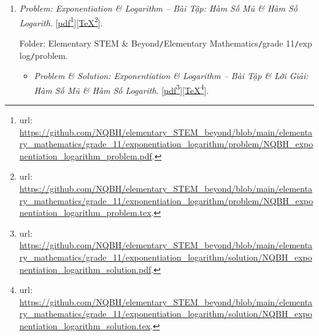 \documentclass[12pt,oneside]{book}
\begin{document}
\begin{enumerate}
	Folder: {\sf Elementary STEM \& Beyond{\tt/}Elementary Mathematics{\tt/}grade 11{\tt/}probability \& statistics{\tt/}problem}.
	\begin{itemize}
		\item {\it Problem \& Solution: Probability \& Statistics -- Bài Tập \& Lời Giải: Xác Suất \& Thống Kê}. [\href{https://github.com/NQBH/elementary_STEM_beyond/blob/main/elementary_mathematics/grade_11/probability_statistics/solution/NQBH_probability_statistics_solution.pdf}{pdf}\footnote{{\sc url}: \url{https://github.com/NQBH/elementary_STEM_beyond/blob/main/elementary_mathematics/grade_11/probability_statistics/solution/NQBH_probability_statistics_solution.pdf}.}][\href{https://github.com/NQBH/elementary_STEM_beyond/blob/main/elementary_mathematics/grade_11/probability_statistics/solution/NQBH_probability_statistics_solution.tex}{\TeX}\footnote{{\sc url}: \url{https://github.com/NQBH/elementary_STEM_beyond/blob/main/elementary_mathematics/grade_11/probability_statistics/solution/NQBH_probability_statistics_solution.tex}.}].
		
		Folder: {\sf Elementary STEM \& Beyond{\tt/}Elementary Mathematics{\tt/}grade 11{\tt/}probability \& statistics{\tt/}solution}.
	\end{itemize}	
	\item {\it Problem: Exponentiation \& Logarithm -- Bài Tập: Hàm Số Mũ \& Hàm Số Logarith}. [\href{https://github.com/NQBH/elementary_STEM_beyond/blob/main/elementary_mathematics/grade_11/exponentiation_logarithm/problem/NQBH_exponentiation_logarithm_problem.pdf}{pdf}\footnote{{\sc url}: \url{https://github.com/NQBH/elementary_STEM_beyond/blob/main/elementary_mathematics/grade_11/exponentiation_logarithm/problem/NQBH_exponentiation_logarithm_problem.pdf}.}][\href{https://github.com/NQBH/elementary_STEM_beyond/blob/main/elementary_mathematics/grade_11/exponentiation_logarithm/problem/NQBH_exponentiation_logarithm_problem.tex}{\TeX}\footnote{{\sc url}: \url{https://github.com/NQBH/elementary_STEM_beyond/blob/main/elementary_mathematics/grade_11/exponentiation_logarithm/problem/NQBH_exponentiation_logarithm_problem.tex}.}].
	
	Folder: {\sf Elementary STEM \& Beyond{\tt/}Elementary Mathematics{\tt/}grade 11{\tt/}exp log{\tt/}problem}.
	\begin{itemize}
		\item {\it Problem \& Solution: Exponentiation \& Logarithm -- Bài Tập \& Lời Giải: Hàm Số Mũ \& Hàm Số Logarith}. [\href{https://github.com/NQBH/elementary_STEM_beyond/blob/main/elementary_mathematics/grade_11/exponentiation_logarithm/solution/NQBH_exponentiation_logarithm_solution.pdf}{pdf}\footnote{{\sc url}: \url{https://github.com/NQBH/elementary_STEM_beyond/blob/main/elementary_mathematics/grade_11/exponentiation_logarithm/solution/NQBH_exponentiation_logarithm_solution.pdf}.}][\href{https://github.com/NQBH/elementary_STEM_beyond/blob/main/elementary_mathematics/grade_11/exponentiation_logarithm/solution/NQBH_exponentiation_logarithm_solution.tex}{\TeX}\footnote{{\sc url}: \url{https://github.com/NQBH/elementary_STEM_beyond/blob/main/elementary_mathematics/grade_11/exponentiation_logarithm/solution/NQBH_exponentiation_logarithm_solution.tex}.}].
		

\end{itemize}
\end{enumerate}
\end{document}
